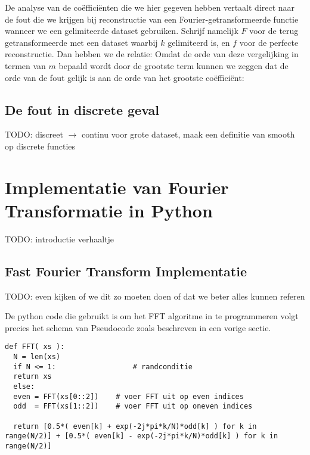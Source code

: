 De analyse van de co\"effici\"enten die we hier gegeven hebben vertaalt direct naar de fout die we krijgen
bij reconstructie van een Fourier-getransformeerde functie wanneer we een gelimiteerde dataset gebruiken.
Schrijf namelijk $F$ voor de terug getransformeerde met een dataset waarbij $k$ gelimiteerd is, en $f$ voor
de perfecte reconstructie. Dan hebben we de relatie:
Omdat de orde van deze vergelijking in termen van $m$ bepaald wordt door de grootste term kunnen we zeggen
dat de orde van de fout gelijk is aan de orde van het grootste co\"effici\"ent:
\subsection{De fout in discrete geval}

TODO: discreet $\to$ continu voor grote dataset, maak een definitie van smooth op discrete functies

\section{Implementatie van Fourier Transformatie in Python}
TODO: introductie verhaaltje

\subsection{Fast Fourier Transform Implementatie}
TODO: even kijken of we dit zo moeten doen of dat we beter alles kunnen referen

De python code die gebruikt is om het FFT algoritme in te programmeren volgt precies het schema van Pseudocode
zoals beschreven in een vorige sectie.

\begin{lstlisting}[caption={FFT algoritme in Python, voert de pseudocode uit zoals in sectie (TODO)}]
  def FFT( xs ):
  N = len(xs)
  if N <= 1:                  # randconditie
  return xs
  else:
  even = FFT(xs[0::2])    # voer FFT uit op even indices
  odd  = FFT(xs[1::2])    # voer FFT uit op oneven indices

  return [0.5*( even[k] + exp(-2j*pi*k/N)*odd[k] ) for k in range(N/2)] + [0.5*( even[k] - exp(-2j*pi*k/N)*odd[k] ) for k in range(N/2)]
\end{lstlisting}

